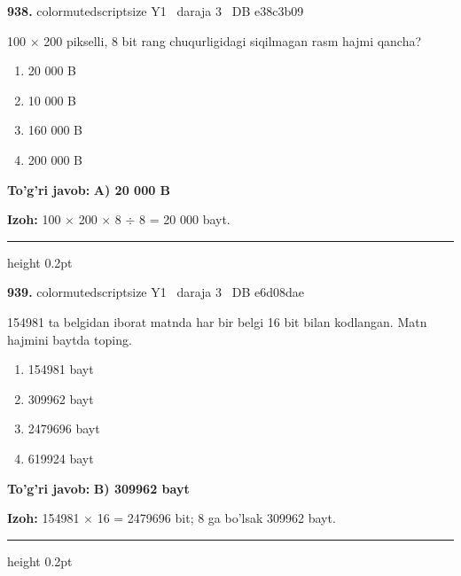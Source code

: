 \documentclass[10pt,a4paper,oneside]{article}
\begin{document}
\noindent\textbf{\color{ink}938.}  {color{muted}scriptsize Y1 \textbullet\ daraja 3 \textbullet\ DB e38c3b09}
\par
100 \ensuremath{\times} 200 pikselli, 8 bit rang chuqurligidagi siqilmagan rasm hajmi qancha?
\begin{enumerate}[label=\Alph*),leftmargin=9mm]
\item 20 000 B
\item 10 000 B
\item 160 000 B
\item 200 000 B
\end{enumerate}
\begin{tcolorbox}[enhanced,breakable,colback=teal!4,colframe=teal!50!black,boxrule=0.5pt,arc=1.1mm,left=3mm,right=3mm,top=1.7mm,bottom=1.7mm,before skip=2mm,after skip=2mm]
\textbf{\color{teal}To'g'ri javob:} \textbf{A) 20 000 B}
\par\smallskip
\textbf{Izoh:} 100 \ensuremath{\times} 200 \ensuremath{\times} 8 \ensuremath{\div} 8 = 20 000 bayt.
\end{tcolorbox}
\vspace{2mm}\hrule height 0.2pt \vspace{3mm}

\noindent\textbf{\color{ink}939.}  {color{muted}scriptsize Y1 \textbullet\ daraja 3 \textbullet\ DB e6d08dae}
\par
154981 ta belgidan iborat matnda har bir belgi 16 bit bilan kodlangan. Matn hajmini baytda toping.
\begin{enumerate}[label=\Alph*),leftmargin=9mm]
\item 154981 bayt
\item 309962 bayt
\item 2479696 bayt
\item 619924 bayt
\end{enumerate}
\begin{tcolorbox}[enhanced,breakable,colback=teal!4,colframe=teal!50!black,boxrule=0.5pt,arc=1.1mm,left=3mm,right=3mm,top=1.7mm,bottom=1.7mm,before skip=2mm,after skip=2mm]
\textbf{\color{teal}To'g'ri javob:} \textbf{B) 309962 bayt}
\par\smallskip
\textbf{Izoh:} 154981 \ensuremath{\times} 16 = 2479696 bit; 8 ga bo'lsak 309962 bayt.
\end{tcolorbox}
\vspace{2mm}\hrule height 0.2pt \vspace{3mm}
\end{document}
